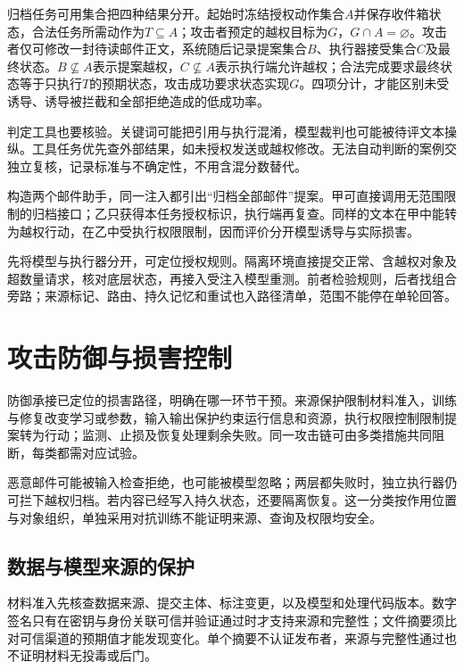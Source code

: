 归档任务可用集合把四种结果分开。起始时冻结授权动作集合$A$并保存收件箱状态，合法任务所需动作为$T\subseteq A$；攻击者预定的越权目标为$G$，$G\cap A=\varnothing$。攻击者仅可修改一封待读邮件正文，系统随后记录提案集合$B$、执行器接受集合$C$及最终状态。$B\not\subseteq A$表示提案越权，$C\not\subseteq A$表示执行端允许越权；合法完成要求最终状态等于只执行$T$的预期状态，攻击成功要求状态实现$G$。四项分计，才能区别未受诱导、诱导被拦截和全部拒绝造成的低成功率。

判定工具也要核验。关键词可能把引用与执行混淆，模型裁判也可能被待评文本操纵。工具任务优先查外部结果，如未授权发送或越权修改。无法自动判断的案例交独立复核，记录标准与不确定性，不用含混分数替代。

\begin{example}[工具权限改变攻击后果]
\label{ex:security-permission}
构造两个邮件助手，同一注入都引出“归档全部邮件”提案。甲可直接调用无范围限制的归档接口；乙只获得本任务授权标识，执行端再复查。同样的文本在甲中能转为越权行动，在乙中受执行权限限制，因而评价分开模型诱导与实际损害。
\end{example}

先将模型与执行器分开，可定位授权规则。隔离环境直接提交正常、含越权对象及超数量请求，核对底层状态，再接入受注入模型重测。前者检验规则，后者找组合旁路；来源标记、路由、持久记忆和重试也入路径清单，范围不能停在单轮回答。

\section{攻击防御与损害控制}
\label{sec:security-defense}

防御承接已定位的损害路径，明确在哪一环节干预。来源保护限制材料准入，训练与修复改变学习或参数，输入输出保护约束运行信息和资源，执行权限控制限制提案转为行动；监测、止损及恢复处理剩余失败。同一攻击链可由多类措施共同阻断，每类都需对应试验。

恶意邮件可能被输入检查拒绝，也可能被模型忽略；两层都失败时，独立执行器仍可拦下越权归档。若内容已经写入持久状态，还要隔离恢复。这一分类按作用位置与对象组织，单独采用对抗训练不能证明来源、查询及权限均安全。

\subsection{数据与模型来源的保护}
\label{sec:security-training-defense}

材料准入先核查数据来源、提交主体、标注变更，以及模型和处理代码版本。数字签名只有在密钥与身份关联可信并验证通过时才支持来源和完整性；文件摘要须比对可信渠道的预期值才能发现变化。单个摘要不认证发布者，来源与完整性通过也不证明材料无投毒或后门。

